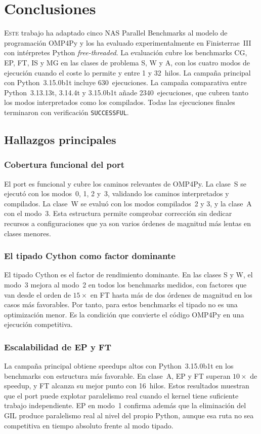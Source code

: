 \chapter{Conclusiones}
\label{chap:conclusiones}

\lettrine{E}{ste} trabajo ha adaptado cinco NAS Parallel Benchmarks al modelo
de programación OMP4Py y los ha evaluado experimentalmente en Finisterrae~III
con intérpretes Python \emph{free-threaded}. La evaluación cubre los benchmarks
CG, EP, FT, IS y MG en las clases de problema S, W y A, con los cuatro modos de
ejecución cuando el coste lo permite y entre 1 y 32~hilos. La campaña
principal con Python~3.15.0b1t incluye 630~ejecuciones. La campaña comparativa
entre Python~3.13.13t, 3.14.4t y 3.15.0b1t añade 2340~ejecuciones, que cubren
tanto los modos interpretados como los compilados. Todas las ejecuciones finales
terminaron con verificación \texttt{SUCCESSFUL}.


\section{Hallazgos principales}
\label{sec:hallazgos}

\subsection{Cobertura funcional del port}
El port es funcional y cubre los caminos relevantes de OMP4Py. La clase~S se
ejecutó con los modos~0, 1, 2 y~3, validando los caminos
interpretados y compilados. La clase~W se evaluó con los modos compilados~2 y
3, y la clase~A con el modo~3. Esta estructura permite comprobar corrección sin
dedicar recursos a configuraciones que ya son varios órdenes de magnitud más
lentas en clases menores.

\subsection{El tipado Cython como factor dominante}
El tipado Cython es el factor de rendimiento dominante. En las clases S y W, el
modo~3 mejora al modo~2 en todos los benchmarks medidos, con factores que van
desde el orden de $15\times$ en FT hasta más de dos órdenes de magnitud en los
casos más favorables. Por tanto, para estos benchmarks el tipado no es una
optimización menor. Es la condición que convierte el código OMP4Py en una
ejecución competitiva.

\subsection{Escalabilidad de EP y FT}
La campaña principal obtiene speedups altos con Python~3.15.0b1t en los
benchmarks con estructura más favorable. En clase~A, EP y FT superan
$10\times$ de speedup, y FT alcanza su mejor punto con 16~hilos. Estos
resultados muestran que el port puede explotar paralelismo real cuando el kernel
tiene suficiente trabajo independiente. EP en modo~1 confirma además que la
eliminación del GIL produce paralelismo real al nivel del propio Python, aunque
esa ruta no sea competitiva en tiempo absoluto frente al modo tipado.

